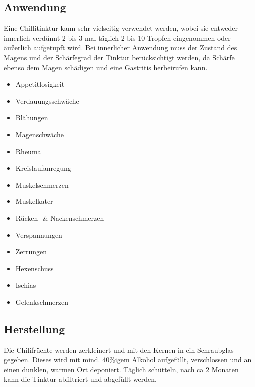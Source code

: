                


\subsection{Anwendung}

Eine Chillitinktur kann sehr vielseitig verwendet werden, wobei sie entweder innerlich verdünnt 2 bis 3  mal täglich 2 bis 10 Tropfen eingenommen oder äußerlich aufgetupft wird. Bei innerlicher Anwendung muss der Zustand des Magens und der Schärfegrad der Tinktur berücksichtigt werden, da Schärfe ebenso dem Magen schädigen und eine Gastritis herbeirufen kann. 



\begin{itemize}
	\item Appetitlosigkeit
	\item Verdauungsschwäche
	\item Blähungen
	\item Magenschwäche
	\item Rheuma
	\item Kreislaufanregung
	\item Muskelschmerzen
	\item Muskelkater
	\item Rücken- \& Nackenschmerzen
	\item Verspannungen
	\item Zerrungen
	\item Hexenschuss
	\item Ischias
	\item Gelenkschmerzen 
\end{itemize}

\subsection{Herstellung}

Die Chilifrüchte werden zerkleinert und mit den Kernen in ein Schraubglas gegeben. Dieses wird mit mind. 40\%igem Alkohol aufgefüllt, verschlossen und an einen dunklen, warmen Ort deponiert. Täglich schütteln, nach ca 2 Monaten kann die Tinktur abfiltriert und abgefüllt werden.

